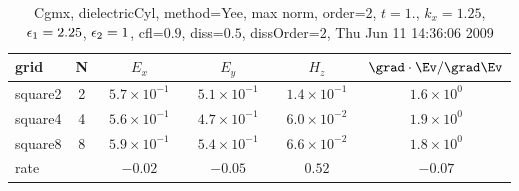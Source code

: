 \begin{table}[hbt]\tableFont %
\begin{center}
\begin{tabular}{|l|c|c|c|c|c|} \hline 
grid  & N &  $E_x$ &  $E_y$ & $H_z$ & $\grad\cdot\Ev/\grad\Ev$\\ \hline 
             square2 &     2 & ~$5.7\times10^{ -1}$~ & ~$5.1\times10^{ -1}$~ & ~$1.4\times10^{ -1}$~ & ~$1.6\times10^{  0}$~  \\ \hline
             square4 &     4 & ~$5.6\times10^{ -1}$~ & ~$4.7\times10^{ -1}$~ & ~$6.0\times10^{ -2}$~ & ~$1.9\times10^{  0}$~  \\ \hline
             square8 &     8 & ~$5.9\times10^{ -1}$~ & ~$5.4\times10^{ -1}$~ & ~$6.6\times10^{ -2}$~ & ~$1.8\times10^{  0}$~  \\ \hline
    rate             &       &       $-0.02$          &       $-0.05$          &       $0.52$          &       $-0.07$           \\ \hline
\end{tabular}
\caption{Cgmx, dielectricCyl, method=Yee, max norm, order=$2$, $t=1.$, $k_x=1.25$, $\epsilon_1=2.25$, $\epsilon_2=1$, cfl=$0.9$, diss=$0.5$, dissOrder=$2$, Thu Jun 11 14:36:06 2009}\label{table:dielectricCylYeeOrder2max}
\end{center}
\end{table}
